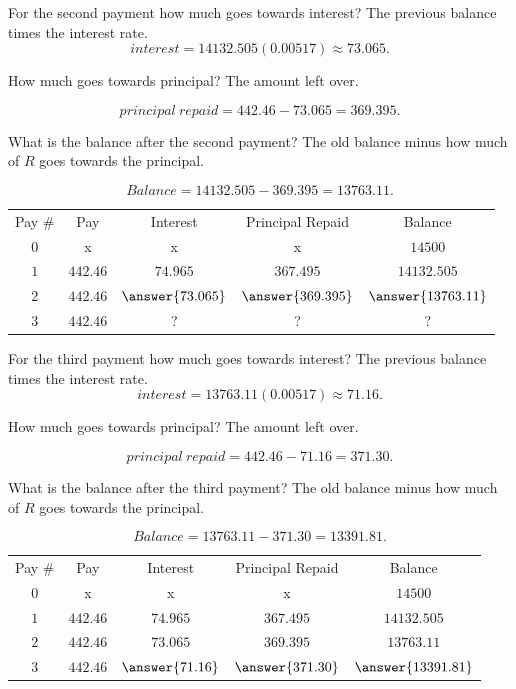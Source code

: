 \begin{problem}
\begin{problem}
    \begin{problem}
        For the second payment how much goes towards interest? The previous balance times the interest rate.
        \[interest = 14132.505(0.00517) \approx 73.065.\]

        How much goes towards principal? The amount left over.

    \[principal \ repaid = 442.46 - 73.065 = 369.395.\]

    What is the balance after the second payment? The old balance minus how much of \(R\) goes towards the principal.

    \[Balance = 14132.505 - 369.395 = 13763.11.\]

    \begin{tabular}{c|c|c|c|c}
         Pay \# & Pay & Interest & Principal Repaid & Balance\\
         \(0\) & x & x & x & \(14500\) \\
         \(1\) & \(442.46\) & \(74.965\) & \(367.495\) & \(14132.505\) \\
         \(2\) & \(442.46\) & \(\answer{73.065}\) & \(\answer{369.395}\) & \(\answer{13763.11}\)\\
         \(3\) & \(442.46\) & ?  & ? & ?
    \end{tabular}

    \begin{problem}
        For the third payment how much goes towards interest? The previous balance times the interest rate.
        \[interest = 13763.11(0.00517) \approx 71.16.\]

        How much goes towards principal? The amount left over.

    \[principal \ repaid = 442.46 - 71.16 = 371.30.\]

    What is the balance after the third payment? The old balance minus how much of \(R\) goes towards the principal.

    \[Balance = 13763.11 - 371.30 = 13391.81.\]

    \begin{tabular}{c|c|c|c|c}
         Pay \# & Pay & Interest & Principal Repaid & Balance\\
         \(0\) & x & x & x & \(14500\) \\
         \(1\) & \(442.46\) & \(74.965\) & \(367.495\) & \(14132.505\) \\
         \(2\) & \(442.46\) & \(73.065\) & \(369.395\) & \(13763.11\)\\
         \(3\) & \(442.46\) & \(\answer{71.16}\) & \(\answer{371.30}\) & \(\answer{13391.81}\)
    \end{tabular}
    \end{problem}
    \end{problem}
\end{problem}


\end{problem}
